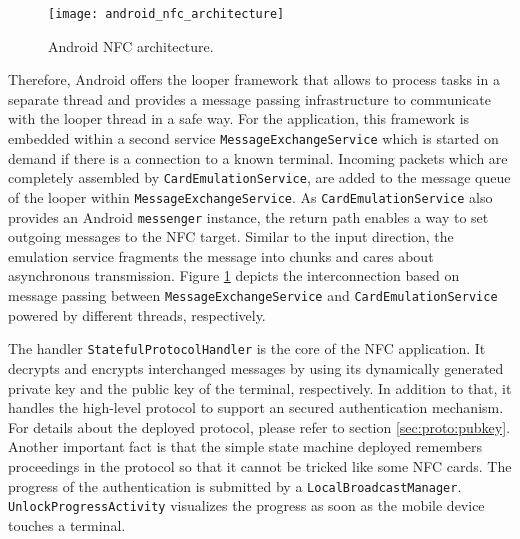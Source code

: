%
\begin{figure}[h]
    \centering
    \texttt{[image: android\_nfc\_architecture]}
    \caption{Android NFC architecture.}
    \label{fig:android:nfc_arch}
\end{figure}
%
Therefore, Android offers the looper framework that allows to process tasks in a separate thread and provides a message passing infrastructure to communicate with the looper thread in a safe way.
For the application, this framework is embedded within a second service \texttt{MessageExchangeService} which is started on demand if there is a connection to a known terminal.
Incoming packets which are completely assembled by \texttt{CardEmulationService}, are added to the message queue of the looper within \texttt{MessageExchangeService}.
As \texttt{CardEmulationService} also provides an Android \texttt{messenger} instance, the return path enables a way to set outgoing messages to the NFC target.
Similar to the input direction, the emulation service fragments the message into chunks and cares about asynchronous transmission.
Figure \ref{fig:android:nfc_arch} depicts the interconnection based on message passing between \texttt{MessageExchangeService} and \texttt{CardEmulationService} powered by different threads, respectively.

The handler \texttt{StatefulProtocolHandler} is the core of the NFC application. It decrypts and encrypts interchanged messages by using its dynamically generated private key and the public key of the terminal, respectively.
In addition to that, it handles the high-level protocol to support an secured authentication mechanism. For details about the deployed protocol, please refer to section \ref{sec:proto:pubkey}.
Another important fact is that the simple state machine deployed remembers proceedings in the protocol so that it cannot be tricked like some NFC cards.
The progress of the authentication is submitted by a \texttt{LocalBroadcastManager}. \texttt{UnlockProgressActivity} visualizes the progress as soon as the mobile device touches a terminal.